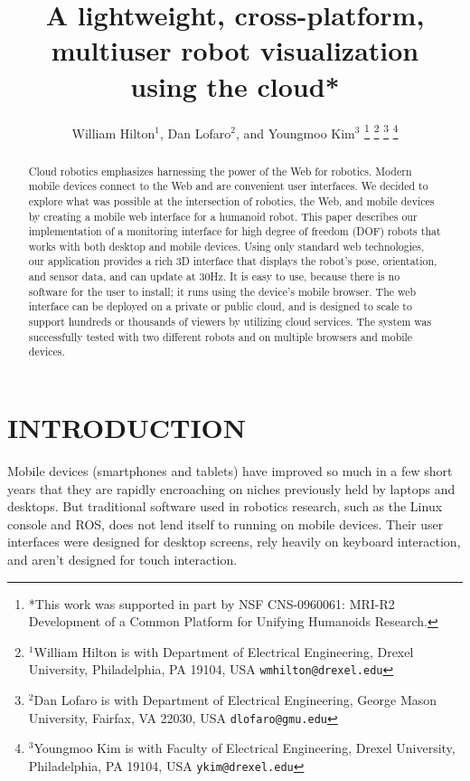 \documentclass[letterpaper, 10 pt, conference]{ieee/ieeeconf}  %
\title{\LARGE \bf
A lightweight, cross-platform, multiuser robot visualization \\ using the cloud*
}
\author{William Hilton$^{1}$, Dan Lofaro$^{2}$, and Youngmoo Kim$^{3}$%
\thanks{*This work was supported in part by NSF CNS-0960061: MRI-R2 Development of a Common Platform for Unifying Humanoids Research.}%
\thanks{$^{1}$William Hilton is with Department of Electrical Engineering, Drexel University,
        Philadelphia, PA 19104, USA
        {\tt\small wmhilton@drexel.edu}}%
\thanks{$^{2}$Dan Lofaro is with Department of Electrical Engineering, George Mason University,
        Fairfax, VA 22030, USA
        {\tt\small dlofaro@gmu.edu}}%
\thanks{$^{3}$Youngmoo Kim is with Faculty of Electrical Engineering, Drexel University,
        Philadelphia, PA 19104, USA
        {\tt\small ykim@drexel.edu}}%
}
\begin{document}
\maketitle
\thispagestyle{empty}
\pagestyle{empty}






\begin{abstract}
Cloud robotics emphasizes harnessing the power of the Web for robotics.
Modern mobile devices connect to the Web and are convenient user interfaces.
We decided to explore what was possible at the intersection of robotics, the Web, and mobile devices by creating a mobile web interface for a humanoid robot.
This paper describes our implementation of a monitoring interface for high degree of freedom (DOF) robots that works with both desktop and mobile devices.
Using only standard web technologies, our application provides a rich 3D interface that displays the robot's pose, orientation, and sensor data, and can update at 30Hz.
It is easy to use, because there is no software for the user to install; it runs using the device's mobile browser.
The web interface can be deployed on a private or public cloud, and is designed to scale to support hundreds or thousands of viewers by utilizing cloud services.
The system was successfully tested with two different robots and on multiple browsers and mobile devices.
\end{abstract}


\section{INTRODUCTION}
Mobile devices (smartphones and tablets) have improved so much in a few short years that they are rapidly encroaching on niches previously held by laptops and desktops.
But traditional software used in robotics research, such as the Linux console and ROS, does not lend itself to running on mobile devices.
Their user interfaces were designed for desktop screens, rely heavily on keyboard interaction, and aren't designed for touch interaction.
\end{document}
